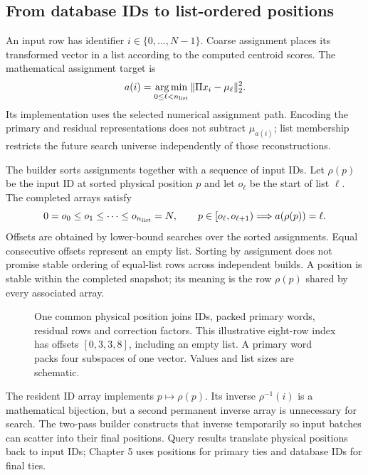 \subsection{From database IDs to list-ordered positions}

An input row has identifier $i\in\{0,\ldots,N-1\}$. Coarse assignment
places its transformed vector in a list according to the computed
centroid scores. The mathematical assignment target is
\begin{equation}
 a(i)=\operatorname*{arg\,min}_{0\leq\ell<n_{\rm list}}
       \|\Pi x_i-\mu_\ell\|_2^2.
 \label{eq:4-assignment}
\end{equation}
Its implementation uses the selected numerical assignment path. Encoding
the primary and residual representations does not subtract $\mu_{a(i)}$;
list membership restricts the future search universe independently of
those reconstructions.

The builder sorts assignments together with a sequence of input IDs.
Let $\rho(p)$ be the input ID at sorted physical position $p$ and let
$o_\ell$ be the start of list $\ell$. The completed arrays satisfy
\begin{equation}
 0=o_0\leq o_1\leq\cdots\leq o_{n_{\rm list}}=N,
 \qquad p\in[o_\ell,o_{\ell+1})\Longrightarrow a(\rho(p))=\ell.
 \label{eq:4-offsets}
\end{equation}
Offsets are obtained by lower-bound searches over the sorted assignments.
Equal consecutive offsets represent an empty list. Sorting by assignment
does not promise stable ordering of equal-list rows across independent
builds. A position is stable within the completed snapshot; its meaning
is the row $\rho(p)$ shared by every associated array.

\begin{figure}[tbp]
\centering

\caption[List-ordered physical index layout]{One common physical position joins IDs, packed primary words,
residual rows and correction factors. This illustrative eight-row index
has offsets $[0,3,3,8]$, including an empty list. A primary word packs
four subspaces of one vector. Values and list sizes are schematic.}
\label{fig:4-layout}
\end{figure}

The resident ID array implements $p\mapsto\rho(p)$. Its inverse
$\rho^{-1}(i)$ is a mathematical bijection, but a second permanent
inverse array is unnecessary for search. The two-pass builder constructs
that inverse temporarily so input batches can scatter into their final
positions. Query results translate physical positions back to input IDs;
Chapter 5 uses positions for primary ties and database IDs for final ties.

